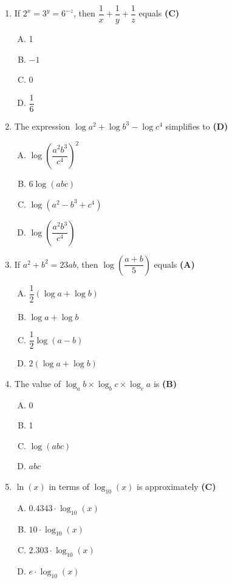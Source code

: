 \documentclass[10pt,a4paper]{article}
\begin{document}
\begin{enumerate}[1.]
\item If $2^x = 3^y = 6^{-z}$, then $\dfrac{1}{x} + \dfrac{1}{y} + \dfrac{1}{z}$ equals \hfill \textbf{(C)}
\begin{enumerate}[(A)]
    \item 1
    \item $-1$
    \item 0
    \item $\dfrac{1}{6}$
\end{enumerate}

\item The expression $\log a^2 + \log b^3 - \log c^4$ simplifies to \hfill \textbf{(D)}
\begin{enumerate}[(A)]
    \item $\log\!\left(\dfrac{a^2 b^3}{c^4}\right)^2$
    \item $6\log(abc)$
    \item $\log(a^2 - b^3 + c^4)$
    \item $\log\!\left(\dfrac{a^2 b^3}{c^4}\right)$
\end{enumerate}

\item If $a^2 + b^2 = 23ab$, then $\log\!\left(\dfrac{a+b}{5}\right)$ equals \hfill \textbf{(A)}
\begin{enumerate}[(A)]
    \item $\dfrac{1}{2}(\log a + \log b)$
    \item $\log a + \log b$
    \item $\dfrac{1}{2}\log(a-b)$
    \item $2(\log a + \log b)$
\end{enumerate}

\item The value of $\log_a b \times \log_b c \times \log_c a$ is \hfill \textbf{(B)}
\begin{enumerate}[(A)]
    \item 0
    \item 1
    \item $\log(abc)$
    \item $abc$
\end{enumerate}

\item $\ln(x)$ in terms of $\log_{10}(x)$ is approximately \hfill \textbf{(C)}
\begin{enumerate}[(A)]
    \item $0.4343 \cdot \log_{10}(x)$
    \item $10 \cdot \log_{10}(x)$
    \item $2.303 \cdot \log_{10}(x)$
    \item $e \cdot \log_{10}(x)$
\end{enumerate}


\end{enumerate}
\end{document}
